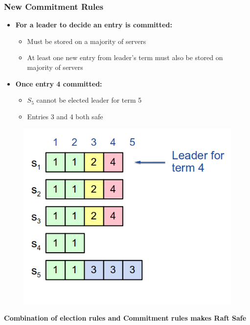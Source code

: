 \begin{frame}
    \frametitle{New Commitment Rules}
    \begin{minipage}{.55\textwidth}
        \begin{itemize}
            \item \textbf{For a leader to decide an entry is committed:}
                \begin{itemize}
                    \item Must be stored on a majority of servers
                    \item At least one new entry from leader's term must also be stored on majority of servers
                \end{itemize}
            \item \textbf{Once entry 4 committed:}
                \begin{itemize}
                    \item $S_5$ cannot be elected leader for term 5
                    \item Entries 3 and 4 both safe
                \end{itemize}
        \end{itemize}
    \end{minipage}
    \begin{minipage}{.4\textwidth}
        \begin{figure}[hp]
            \includegraphics[scale=0.3]{./figures/raft-commit-rule.png}
        \end{figure}
    \end{minipage}
    \centering
    \textbf{Combination of election rules and Commitment rules makes Raft Safe}
\end{frame}

